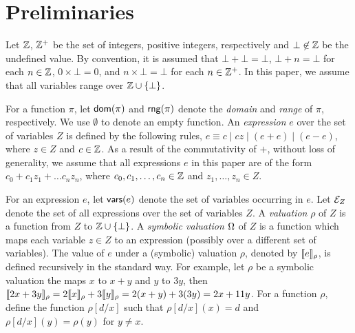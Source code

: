 
\section{Preliminaries}
\label{sec:preliminaries}
Let ${\mathbb{Z} }$,  ${\mathbb{Z} }^+$ be the set of integers, positive integers, respectively and $\bot \not \in {\mathbb{Z} }$ be  the undefined value. By convention, it is assumed that $\bot + \bot = \bot$, $\bot + n = \bot$ for each $n \in {\mathbb{Z} }$, $0 \times \bot = 0$, and $n \times \bot = \bot$ for each $n \in {\mathbb{Z} }^+$.
In this paper, we assume that all variables range over ${\mathbb{Z} } \cup \{\bot\}$.  

For a function $\pi$, let $\mathsf{dom}(\pi)$ and $\mathsf{rng}(\pi)$ denote the \emph{domain}  and \emph{range} of $\pi$, respectively. We use $\emptyset$ to denote an empty function. An \emph{expression} $e$ over the set of variables $Z$ is defined by the following rules, $e\equiv  c \mid  c z \mid (e + e) \mid (e - e)$, where $z \in Z$ and $c\in {\mathbb{Z} }$.  As a result of the commutativity of $+$, without loss of generality, we assume that all expressions $e$ in this paper are of the form $c_0 + c_1 z_1 + \dots c_n z_n$, where $c_0, c_1,\dots,c_n \in {\mathbb{Z} }$ and $z_1,\dots,z_n \in Z$. 


For an expression $e$, let $\mathsf{vars}(e)$ denote the set of variables occurring in $e$. Let ${\mathcal{E} }_Z$ denote the set of all expressions over the set of variables $Z$. 
A \emph{valuation} $\rho$ of $Z$ is a function from $Z$ to ${\mathbb{Z} }\cup\{\bot\}$. A \emph{symbolic valuation} $\Omega$ of $Z$ is a function which maps each variable $z \in Z$ to an expression (possibly over a different set of variables). The value of $e$ under a (symbolic) valuation $\rho$, denoted by $\llbracket e\rrbracket_{\rho}$, is defined recursively in the standard way. For example, let $\rho$ be a symbolic valuation the maps $x$ to $x+y$ and $y$ to $3y$, then $\llbracket2x+3y\rrbracket_{\rho}=2\llbracket x\rrbracket_{\rho}+3\llbracket y\rrbracket_{\rho}=2(x+y)+3(3y)=2x+11y$.
For a function $\rho$, define the function $\rho[d/x]$ such that $\rho[d/x](x)=d$ and $\rho[d/x](y)=\rho(y)$ for $y\neq x$. 

